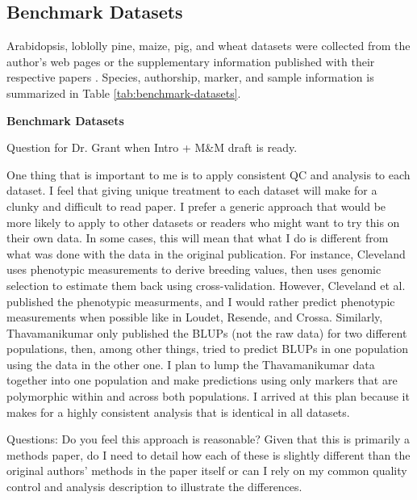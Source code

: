 \documentclass[9pt,twocolumn,twoside]{g3_article/gsag3jnl}
\begin{document}
\subsection*{Benchmark Datasets}

Arabidopsis, loblolly pine, maize, pig, and wheat datasets were collected from the author's web pages
or the supplementary information published with their respective papers \citep{loudet2002, resende2012, crossa2010, cleveland2012, thavamanikumar2015}.
Species, authorship, marker, and sample information is summarized in Table \ref{tab:benchmark-datasets}.

\begin{table*}[htbp]
\renewcommand{\familydefault}{\sfdefault}\normalfont
\centering
\caption{\bf Benchmark Datasets}
\begin{tableminipage}{\textwidth}

\label{tab:benchmark-datasets}
\footnotesize  
\end{tableminipage}
\end{table*}

Question for Dr. Grant when Intro + M&M draft is ready.

One thing that is important to me is to apply consistent QC and analysis to each dataset. 
I feel that giving unique treatment to each dataset will make for a clunky and difficult 
to read paper. I prefer a generic approach that would be more likely to apply to other 
datasets or readers who might want to try this on their own data. In some cases, 
this will mean that what I do is different from what was done with the data in 
the original publication. For instance, Cleveland uses phenotypic measurements to 
derive breeding values, then uses genomic selection to estimate them back using 
cross-validation. However, Cleveland et al. published the phenotypic measurments, 
and I would rather predict phenotypic measurements when possible like in Loudet, 
Resende, and Crossa. Similarly, Thavamanikumar only published the BLUPs (not the raw data) 
for two different populations, then, among other things, tried to predict BLUPs 
in one population using the data in the other one. I plan to lump the Thavamanikumar 
data together into one population and make predictions using only markers that are 
polymorphic within and across both populations. I arrived at this plan because 
it makes for a highly consistent analysis that is identical in all datasets.

Questions: Do you feel this approach is reasonable? Given that this is primarily a methods 
paper, do I need to detail how each of these is slightly different than the original 
authors' methods in the paper itself or can I rely on my common quality control and 
analysis description to illustrate the differences.
\end{document}
